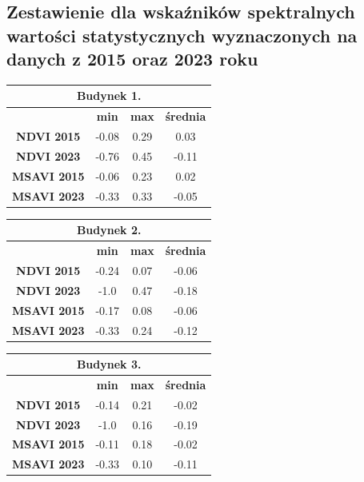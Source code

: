 \documentclass[a4paper,12pt]{article}  %
\begin{document}
\newpage
\subsection{Zestawienie dla wskaźników spektralnych wartości statystycznych wyznaczonych na danych z 2015 oraz 2023 roku}

\begin{table}[h!]
    \centering
    \begin{tabular}{|c|c|c|c|}
    \hline
    \multicolumn{4}{|c|}{\textbf{Budynek 1.}} \\ \hline
    \textbf{} & \textbf{min} & \textbf{max} & \textbf{średnia} \\ \hline
    \textbf{NDVI 2015} & -0.08 & 0.29 & 0.03\\ \hline
    \textbf{NDVI 2023} & -0.76 & 0.45 & -0.11\\ \hline
    \textbf{MSAVI 2015} & -0.06 & 0.23 & 0.02\\ \hline
    \textbf{MSAVI 2023} & -0.33 & 0.33 & -0.05\\ \hline
    \end{tabular}
\end{table}

\begin{table}[h!]
    \centering
    \begin{tabular}{|c|c|c|c|}
    \hline
    \multicolumn{4}{|c|}{\textbf{Budynek 2.}} \\ \hline
    \textbf{} & \textbf{min} & \textbf{max} & \textbf{średnia} \\ \hline
    \textbf{NDVI 2015} & -0.24 & 0.07 & -0.06\\ \hline
    \textbf{NDVI 2023} & -1.0 & 0.47 & -0.18\\ \hline
    \textbf{MSAVI 2015} & -0.17 & 0.08 & -0.06\\ \hline
    \textbf{MSAVI 2023} & -0.33 & 0.24 & -0.12\\ \hline
    \end{tabular}
\end{table}

\begin{table}[h!]
    \centering
    \begin{tabular}{|c|c|c|c|}
    \hline
    \multicolumn{4}{|c|}{\textbf{Budynek 3.}} \\ \hline
    \textbf{} & \textbf{min} & \textbf{max} & \textbf{średnia} \\ \hline
    \textbf{NDVI 2015} & -0.14 & 0.21 & -0.02\\ \hline
    \textbf{NDVI 2023} & -1.0 & 0.16 & -0.19\\ \hline
    \textbf{MSAVI 2015} & -0.11 & 0.18 & -0.02\\ \hline
    \textbf{MSAVI 2023} & -0.33 & 0.10 & -0.11\\ \hline
    \end{tabular}
\end{table}
\end{document}
